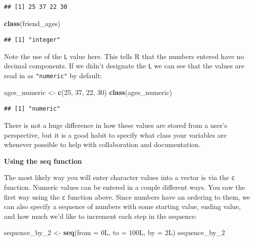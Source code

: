 \documentclass[]{tufte-book}
\newenvironment{Shaded}{\begin{snugshade}}{\end{snugshade}}
\newcommand{\KeywordTok}[1]{\textcolor[rgb]{0.13,0.29,0.53}{\textbf{{#1}}}}
\newcommand{\DataTypeTok}[1]{\textcolor[rgb]{0.13,0.29,0.53}{{#1}}}
\newcommand{\DecValTok}[1]{\textcolor[rgb]{0.00,0.00,0.81}{{#1}}}
\newcommand{\StringTok}[1]{\textcolor[rgb]{0.31,0.60,0.02}{{#1}}}
\newcommand{\NormalTok}[1]{{#1}}
\begin{document}
\begin{verbatim}
## [1] 25 37 22 30
\end{verbatim}

\begin{Shaded}
\begin{Highlighting}[]
\KeywordTok{class}\NormalTok{(friend_ages)}
\end{Highlighting}
\end{Shaded}

\begin{verbatim}
## [1] "integer"
\end{verbatim}

Note the use of the \texttt{L} value here. This tells R that the numbers
entered have no decimal components. If we didn't designate the
\texttt{L} we can see that the values are read in as \texttt{"numeric"}
by default:

\begin{Shaded}
\begin{Highlighting}[]
\NormalTok{ages_numeric <-}\StringTok{ }\KeywordTok{c}\NormalTok{(}\DecValTok{25}\NormalTok{, }\DecValTok{37}\NormalTok{, }\DecValTok{22}\NormalTok{, }\DecValTok{30}\NormalTok{)}
\KeywordTok{class}\NormalTok{(ages_numeric)}
\end{Highlighting}
\end{Shaded}

\begin{verbatim}
## [1] "numeric"
\end{verbatim}

There is not a huge difference in how these values are stored from a
user's perspective, but it is a good habit to specify what class your
variables are whenever possible to help with collaboration and
documentation. \newline

\vspace*{0.2in}

\noindent\textbf{Using the seq function}\vspace*{0.1in}

The most likely way you will enter character values into a vector is via
the \texttt{c} function. Numeric values can be entered in a couple
different ways. You saw the first way using the \texttt{c} function
above. Since numbers have an ordering to them, we can also specify a
sequence of numbers with some starting value, ending value, and how much
we'd like to increment each step in the sequence:

\begin{Shaded}
\begin{Highlighting}[]
\NormalTok{sequence_by_2 <-}\StringTok{ }\KeywordTok{seq}\NormalTok{(}\DataTypeTok{from =} \NormalTok{0L, }\DataTypeTok{to =} \NormalTok{100L, }\DataTypeTok{by =} \NormalTok{2L)}
\NormalTok{sequence_by_2}
\end{Highlighting}
\end{Shaded}
\end{document}
